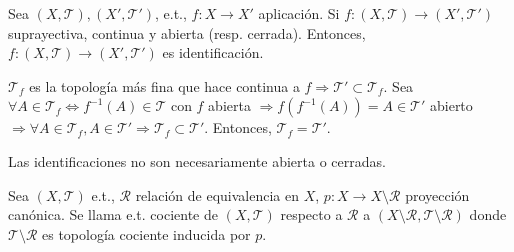 \begin{prop}
  Sea $ ( X, \mathcal{T} ), ( X', \mathcal{T}' )$, e.t., $f: X \to X'$ aplicación. Si $f: ( X, \mathcal{T} ) \to ( X', \mathcal{T}' )$ suprayectiva, continua y abierta (resp. cerrada). Entonces, $f: ( X, \mathcal{T} ) \to ( X', \mathcal{T}' )$ es identificación.
\end{prop}

\begin{dem}
  $\mathcal{T}_{f}$ es la topología más fina que hace continua a $f \Rightarrow \mathcal{T}' \subset \mathcal{T}_{f}$. Sea $\forall A \in \mathcal{T}_{f} \Leftrightarrow f^{-1}(A) \in \mathcal{T}$ con $ f$ abierta $\Rightarrow f(f^{-1}(A)) = A \in \mathcal{T}'$ abierto $\Rightarrow \forall A \in \mathcal{T}_{f}, A \in \mathcal{T}' \Rightarrow \mathcal{T}_{f} \subset \mathcal{T}'$. Entonces, $\mathcal{T}_{f} = \mathcal{T}'$.
\end{dem}

\begin{obs}
  Las identificaciones no son necesariamente abierta o cerradas.
\end{obs}

\begin{defn}
  Sea $ ( X, \mathcal{T} )$ e.t., $\mathcal{R}$ relación de equivalencia en $X$, $p: X \to X \setminus \mathcal{R}$ proyección canónica. Se llama e.t. cociente de $ ( X, \mathcal{T} )$ respecto a $ \mathcal{R}$ a $( X \setminus \mathcal{R}, \mathcal{T} \setminus \mathcal{R} )$ donde $\mathcal{T} \setminus \mathcal{R}$ es topología cociente inducida por $p$.
\end{defn}
